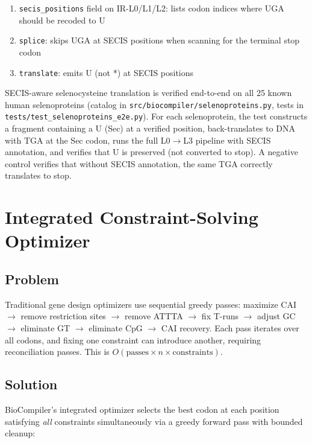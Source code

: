 \documentclass[11pt,a4paper]{article}
\theoremstyle{definition}
\begin{document}
\begin{enumerate}[leftmargin=*,itemsep=1pt]
\item \texttt{secis\_positions} field on IR-L0/L1/L2: lists codon indices where UGA should be recoded to U
\item \texttt{splice}: skips UGA at SECIS positions when scanning for the terminal stop codon
\item \texttt{translate}: emits U (not *) at SECIS positions
\end{enumerate}

SECIS-aware selenocysteine translation is verified end-to-end on all 25 known human selenoproteins (catalog in \texttt{src/biocompiler/selenoproteins.py}, tests in \texttt{tests/test\_selenoproteins\_e2e.py}). For each selenoprotein, the test constructs a fragment containing a U (Sec) at a verified position, back-translates to DNA with TGA at the Sec codon, runs the full L0$\to$L3 pipeline with SECIS annotation, and verifies that U is preserved (not converted to stop). A negative control verifies that without SECIS annotation, the same TGA correctly translates to stop.

\section{Integrated Constraint-Solving Optimizer}\label{sec:optimizer}

\subsection{Problem}

Traditional gene design optimizers use sequential greedy passes: maximize CAI $\to$ remove restriction sites $\to$ remove ATTTA $\to$ fix T-runs $\to$ adjust GC $\to$ eliminate GT $\to$ eliminate CpG $\to$ CAI recovery. Each pass iterates over all codons, and fixing one constraint can introduce another, requiring reconciliation passes. This is $O(\text{passes} \times n \times \text{constraints})$.

\subsection{Solution}

BioCompiler's integrated optimizer selects the best codon at each position satisfying \textit{all} constraints simultaneously via a greedy forward pass with bounded cleanup:
\end{document}
